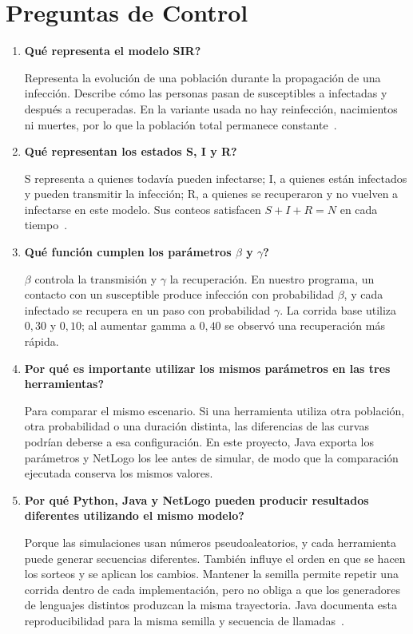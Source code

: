 \documentclass[11pt,a4paper]{article}
\begin{document}
\section{Preguntas de Control}
\begin{enumerate}
\item \textbf{\textquestiondown{}Qué representa el modelo SIR?}
\par Representa la evolución de una población durante la propagación de una infección. Describe cómo las personas pasan de susceptibles a infectadas y después a recuperadas. En la variante usada no hay reinfección, nacimientos ni muertes, por lo que la población total permanece constante~\cite{guia}.

\item \textbf{\textquestiondown{}Qué representan los estados S, I y R?}
\par S representa a quienes todavía pueden infectarse; I, a quienes están infectados y pueden transmitir la infección; R, a quienes se recuperaron y no vuelven a infectarse en este modelo. Sus conteos satisfacen $S+I+R=N$ en cada tiempo~\cite{guia}.

\item \textbf{\textquestiondown{}Qué función cumplen los parámetros $\beta$ y $\gamma$?}
\par $\beta$ controla la transmisión y $\gamma$ la recuperación. En nuestro programa, un contacto con un susceptible produce infección con probabilidad $\beta$, y cada infectado se recupera en un paso con probabilidad $\gamma$. La corrida base utiliza $0{,}30$ y $0{,}10$; al aumentar gamma a $0{,}40$ se observó una recuperación más rápida.

\item \textbf{\textquestiondown{}Por qué es importante utilizar los mismos parámetros en las tres herramientas?}
\par Para comparar el mismo escenario. Si una herramienta utiliza otra población, otra probabilidad o una duración distinta, las diferencias de las curvas podrían deberse a esa configuración. En este proyecto, Java exporta los parámetros y NetLogo los lee antes de simular, de modo que la comparación ejecutada conserva los mismos valores.

\item \textbf{\textquestiondown{}Por qué Python, Java y NetLogo pueden producir resultados diferentes utilizando el mismo modelo?}
\par Porque las simulaciones usan números pseudoaleatorios, y cada herramienta puede generar secuencias diferentes. También influye el orden en que se hacen los sorteos y se aplican los cambios. Mantener la semilla permite repetir una corrida dentro de cada implementación, pero no obliga a que los generadores de lenguajes distintos produzcan la misma trayectoria. Java documenta esta reproducibilidad para la misma semilla y secuencia de llamadas~\cite{java}.


\end{enumerate}
\end{document}
